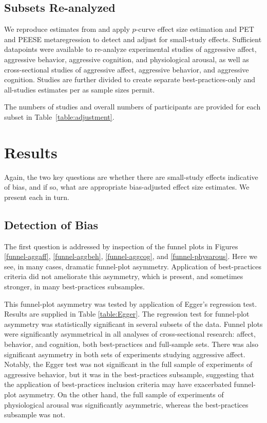 \documentclass[man, mask]{apa6}
\begin{document}
\subsection{Subsets Re-analyzed}
We reproduce estimates from \citet{Anderson:etal:2010} and apply $p$-curve effect size estimation and PET and PEESE metaregression to detect and adjust for small-study effects. Sufficient datapoints were available to re-analyze experimental studies of aggressive affect, aggressive behavior, aggressive cognition, and physiological arousal, as well as cross-sectional studies of aggressive affect, aggressive behavior, and aggressive cognition. Studies are further divided to create separate best-practices-only and all-studies estimates per \citet{Anderson:etal:2010} as sample sizes permit. 

The numbers of studies and overall numbers of participants are provided for each subset in Table~\ref{table:adjustment}.

\section{Results}
Again, the two key questions are whether there are small-study effects indicative of bias, and if so, what are appropriate bias-adjusted effect size estimates. We present each in turn.  

\subsection{Detection of Bias}
The first question is addressed by inspection of the funnel plots in Figures \ref{funnel-aggaff}, \ref{funnel-aggbeh}, \ref{funnel-aggcog}, and \ref{funnel-physarous}.  Here we see, in many cases, dramatic funnel-plot asymmetry. Application of best-practices criteria did not ameliorate this asymmetry, which is present, and sometimes stronger, in many best-practices subsamples.

This funnel-plot asymmetry was tested by application of Egger's regression test. Results are supplied in Table \ref{table:Egger}. 
The regression test for funnel-plot asymmetry was statistically significant in several subsets of the data. Funnel plots were significantly asymmetrical in all analyses of cross-sectional research: affect, behavior, and cognition, both best-practices and full-sample sets. There was also significant asymmetry in both sets of experiments studying aggressive affect.
Notably, the Egger test was not significant in the full sample of experiments of aggressive behavior, but it was in the best-practices subsample, suggesting that the application of best-practices inclusion criteria may have exacerbated funnel-plot asymmetry. On the other hand, the full sample of experiments of physiological arousal was significantly asymmetric, whereas the best-practices subsample was not.
\end{document}
